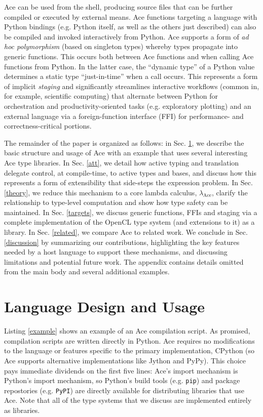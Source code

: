 \documentclass[10pt,preprint]{sigplanconf}
\newcommand{\lamAce}{\lambda_{\text{Ace}}}
\begin{document}
Ace can be used from the shell, producing source files that can be further compiled or executed by external means. Ace functions targeting a language with Python bindings (e.g. Python itself, as well as the others just described) can also be compiled and invoked interactively from Python. Ace supports a form of \emph{ad hoc polymorphism} (based on singleton types) whereby types propagate into generic functions. This occurs both between Ace functions and when calling Ace functions from Python. In the latter case, the ``dynamic type'' of a Python value determines a static type ``just-in-time'' when a call occurs. This represents a form of implicit \emph{staging} and significantly streamlines interactive workflows (common in, for example, scientific computing) that alternate between Python for orchestration and productivity-oriented tasks (e.g. exploratory plotting) and an external language via a foreign-function interface (FFI) for performance- and correctness-critical portions.%

The remainder of the paper is organized as follows: in Sec. \ref{usage}, we describe the basic structure and usage of Ace with an example that uses several interesting Ace type libraries. In Sec. \ref{att}, we detail how active typing and translation delegate control, at compile-time, to active types and bases, and discuss how this represents a form of extensibility that side-steps the expression problem. In Sec. \ref{theory}, we reduce this mechanism to  a core lambda calculus, $\lamAce$,  clarify the relationship to   type-level computation and show how type safety can be maintained. In Sec. \ref{targets}, we discuss generic functions, FFIs and staging via a complete implementation of the OpenCL type system (and extensions to it) as a library.  In Sec.  \ref{related}, we compare Ace to related work. We conclude in Sec. \ref{discussion} by summarizing our contributions, highlighting the key features needed by a host language to support these mechanisms, and discussing limitations and potential future work. The appendix contains details omitted from the main body and several additional examples. 

\section{Language Design and Usage}\label{usage}


%
Listing \ref{example} shows an example of an Ace compilation script. As promised, compilation scripts are written directly in Python. Ace requires no modifications to the language or features specific to the primary implementation, CPython (so Ace supports alternative implementations like Jython and PyPy). This choice pays immediate dividends on the first five lines: Ace's import mechanism is Python's import mechanism, so Python's build tools (e.g. \verb|pip|) and package repostories (e.g. \verb|PyPI|) are directly available for distributing libraries that use Ace. Note that all of the type systems that we discuss are implemented entirely as  libraries.
\end{document}
